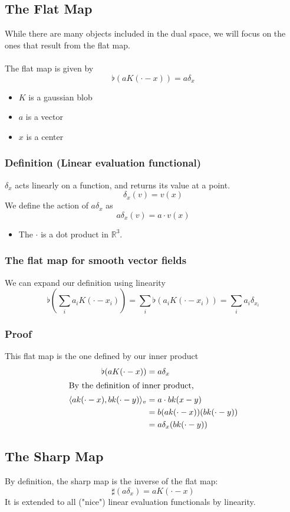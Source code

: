 \documentclass[10pt]{article}
\newcommand{\R}{\mathbb{R}}
\begin{document}
\subsection*{The Flat Map}
While there are many objects included in the dual space, we will focus on the ones that result from the flat map.\\\\
The flat map is given by 
\[\flat(aK(\cdot - x)) = a \delta_x\]
\begin{itemize}
    \item $K$ is a gaussian blob
    \item $a$ is a vector
    \item $x$ is a center
\end{itemize}
\subsubsection*{Definition (Linear evaluation functional)}
$\delta_x$ acts linearly on a function, and returns its value at a point.
\[\delta_x(v) = v(x)\]
We define the action of $a\delta_x$ as
\[a\delta_x(v) = a \cdot v(x)\]
\begin{itemize}
    \item The $\cdot$ is a dot product in $\R^3$.
\end{itemize}
\subsubsection*{The flat map for smooth vector fields}
We can expand our definition using linearity
\[\flat\left(\sum_i a_i K(\cdot - x_i)\right) = \sum_i \flat(a_i K(\cdot - x_i)) = \sum_i a_i \delta_{x_i}\]
\subsubsection*{Proof}
This flat map is the one defined by our inner product
\begin{align*}
    \flat(aK(\cdot - x)) &= a \delta_x \\
    \intertext{By the definition of inner product,}
    \langle ak(\cdot - x), bk(\cdot - y)\rangle_v &= a \cdot b k(x - y)\\
    &= b(ak(\cdot - x))(bk(\cdot - y))\\
    &= a \delta_x(bk(\cdot - y))
\end{align*}

\subsection*{The Sharp Map}
By definition, the sharp map is the inverse of the flat map:
\[\sharp(a \delta_x) = aK(\cdot - x)\]
It is extended to all ("nice") linear evaluation functionals by linearity.
\end{document}
